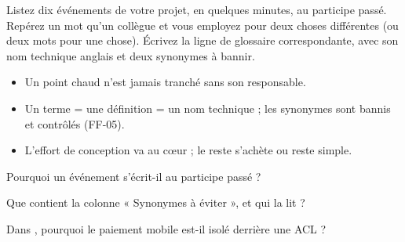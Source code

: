 \begin{vousjouez}
Listez dix événements de votre projet, en quelques minutes, au participe passé. Repérez un mot qu'un collègue
et vous employez pour deux choses différentes (ou deux mots pour une chose). Écrivez la ligne de glossaire correspondante, avec
son nom technique anglais et deux synonymes à bannir.
\end{vousjouez}

\begin{retenir}[À retenir]
\begin{itemize}
  \item Un point chaud n'est jamais tranché sans son responsable.
  \item Un terme = une définition = un nom technique ; les synonymes sont bannis et contrôlés (FF-05).
  \item L'effort de conception va au cœur ; le reste s'achète ou reste simple.
\end{itemize}
\end{retenir}

\begin{acquis}
  \item Pourquoi un événement s'écrit-il au participe passé ?
  \item Que contient la colonne « Synonymes à éviter », et qui la lit ?
  \item Dans \sika{}, pourquoi le paiement mobile est-il isolé derrière une ACL ?
\end{acquis}
